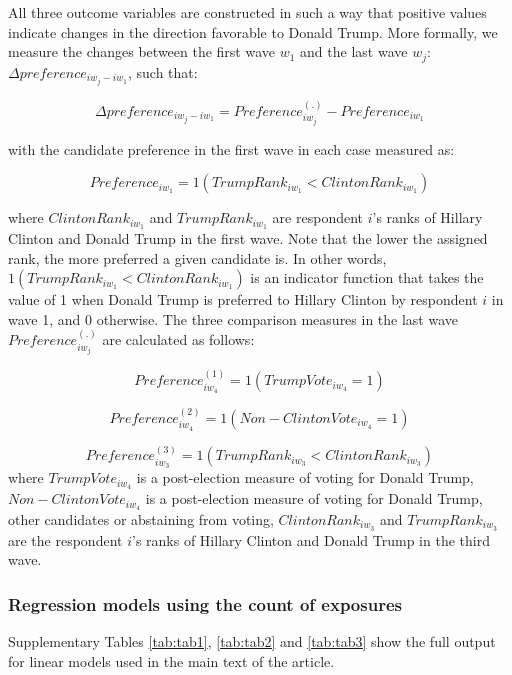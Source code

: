 \documentclass[
  12pt,
]{article}
\begin{document}
All three outcome variables are constructed in such a way that positive values indicate changes in the direction favorable to Donald Trump. More formally, we measure the changes between the first wave \(w_1\) and the last wave \(w_j\): \(\Delta preference_{{iw_{j}}-{iw_{1}}}\), such that:

\[\Delta preference_{{iw_{j}}-{iw_{1}}} = Preference^{(.)}_{iw_{j}} - Preference_{iw_{1}}\]

with the candidate preference in the first wave in each case measured as:

\[Preference_{iw_{1}} = 1(TrumpRank_{iw_{1}} < ClintonRank_{iw_{1}})\]

where \(ClintonRank_{iw_{1}}\) and \(TrumpRank_{iw_{1}}\) are respondent \(i\)'s ranks of Hillary Clinton and Donald Trump in the first wave. Note that the lower the assigned rank, the more preferred a given candidate is. In other words, \(1(TrumpRank_{iw_{1}} < ClintonRank_{iw_{1}})\) is an indicator function that takes the value of 1 when Donald Trump is preferred to Hillary Clinton by respondent \(i\) in wave 1, and 0 otherwise. The three comparison measures in the last wave \(Preference^{(.)}_{iw_{j}}\) are calculated as follows:

\[Preference^{(1)}_{iw_{4}} = 1(TrumpVote_{iw_{4}} = 1)\]

\[Preference^{(2)}_{iw_{4}} = 1(Non-ClintonVote_{iw_{4}} = 1)\]

\[Preference^{(3)}_{iw_{3}} = 1(TrumpRank_{iw_{3}} < ClintonRank_{iw_{3}})\]
where \(TrumpVote_{iw_{4}}\) is a post-election measure of voting for Donald Trump, \(Non-ClintonVote_{iw_{4}}\) is a post-election measure of voting for Donald Trump, other candidates or abstaining from voting, \(ClintonRank_{iw_{3}}\) and \(TrumpRank_{iw_{3}}\) are the respondent \(i\)'s ranks of Hillary Clinton and Donald Trump in the third wave.

\clearpage

\hypertarget{regression-models-using-the-count-of-exposures}{%
\subsubsection{Regression models using the count of exposures}\label{regression-models-using-the-count-of-exposures}}

Supplementary Tables \ref{tab:tab1}, \ref{tab:tab2} and \ref{tab:tab3} show the full output for linear models used in the main text of the article.
\end{document}

